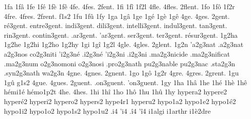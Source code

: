 {%
1fa
1fâ
1fe
1fé
1fè
1fê
4fe.
4fes.
2fent. %
%
1fi
1fî
1f2l
4fle.
4fles.
2flent. %
1fo
1fô
1f2r
4fre.
4fres.
2frent. %
f1s2
1fu
1fû
1fy
1ga
1gâ
1ge
1gé
1gè
1gê
4ge.
4ges.
       2gent.
     ré3gent.
  entre3gent.
   indi3gent.
   dili3gent.
intelli3gent.
  indul3gent.
    tan3gent.
    rin3gent.
 contin3gent.
    .ar3gent.
    'ar3gent.
    ser3gent.
    ter3gent.
résur3gent.
%
1g2ha
1g2he
1g2hi
1g2ho
1g2hy
1gi
1gî
1g2l
4gle.
4gles.
2glent. %
    1g2n
  'a2g3nat     %
  .a2g3nat     %
   a2g3nos     %
  co2g3niti    %
  'i2g3né      %
  .i2g3né      %
  'i2g3ni      %
  .i2g3ni      %
 .ma2g3nicide  %
 .ma2g3nificat %
 .ma2g3num     %
   o2g3nomoni  %
   o2g3nosi    %
.pro2g3nath    %
  pu2g3nable   %
  pu2g3nac     %
.sta2g3n
.syn2g3nath    %
  wa2g3n
4gne.
4gnes.
2gnent. %
1go
1gô
1g2r
4gre.
4gres.
2grent. %
1gu
1gû
g1s2
4gue.
4gues.
   2guent.
.on3guent.
'on3guent.
%
1gy
1ha
1hâ
1he
1hé
1hè
1hê
                    hémi1é
                    hémo1p2t
4he.
4hes.
1hi
1hî
1ho
1hô
1hu
1hû
1hy
                    hypera2
                    hypere2
                    hyperé2
                    hyperi2
                    hypero2
                    hypers2
                    hype4r1
                    hyperu2
                    hypo1a2
                    hypo1e2 %
                    hypo1é2
                    hypo1i2
                    hypo1o2
                    hypo1s2
                    hypo1u2
.i4
'i4
.î4
'î4
                    i1algi
                    i1arthr
                    i1è2dre
}
